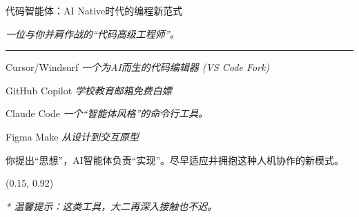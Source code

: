 \documentclass{beamer}
\begin{document}
\begin{frame}{代码智能体：AI Native时代的编程新范式}
    \begin{center}
        \large
        \textit{一位与你并肩作战的“代码高级工程师”。}
    \end{center}

    \vfill
    \rule{\textwidth}{0.4pt}
    \vfill

    \begin{center}
        \huge Cursor/Windsurf
        \large\textit{一个为AI而生的代码编辑器 (VS Code Fork)}
    \end{center}
    
    \vfill

    \begin{center}
        \huge GitHub Copilot
        \large\textit{学校教育邮箱免费白嫖}
    \end{center}

    \vfill

    \begin{center}
        \huge Claude Code 
        \large\textit{一个“智能体风格”的命令行工具。}
    \end{center}

    \begin{center}
        \huge Figma Make 
        \large\textit{从设计到交互原型}
    \end{center}
    \vfill

    \begin{alertblock}{}
        你提出“思想”，AI智能体负责“实现”。尽早适应并拥抱这种人机协作的新模式。
    \end{alertblock}

    \begin{textblock*}{8cm}(0.15\paperwidth, 0.92\paperheight) %
        \begin{flushright}
            \small\textit{* 温馨提示：这类工具，大二再深入接触也不迟。}
        \end{flushright}
    \end{textblock*}
\end{frame}
\end{document}
